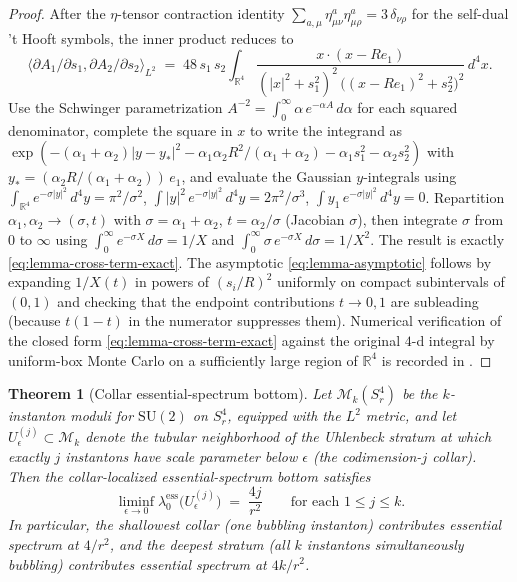 \documentclass[11pt,letterpaper]{article}
\newtheorem{theorem}{Theorem}[section]
\theoremstyle{definition}
\newcommand{\bbR}{\mathbb{R}}
\newcommand{\cM}{\mathcal{M}}
\begin{document}
\begin{proof}
After the $\eta$-tensor contraction identity $\sum_{a,\mu} \eta^a_{\mu\nu}\eta^a_{\mu\rho} = 3\,\delta_{\nu\rho}$ for the self-dual 't Hooft symbols, the inner product reduces to
\[
\langle \partial A_1/\partial s_1, \partial A_2/\partial s_2\rangle_{L^2}
\;=\; 48\,s_1\,s_2 \int_{\bbR^4} \frac{x\cdot(x - R e_1)}{(|x|^2 + s_1^2)^2\,\bigl((x - R e_1)^2 + s_2^2\bigr)^2}\,d^4x.
\]
Use the Schwinger parametrization $A^{-2} = \int_0^\infty \alpha\, e^{-\alpha A}\,d\alpha$ for each squared denominator, complete the square in $x$ to write the integrand as $\exp(-(\alpha_1+\alpha_2)|y - y_*|^2 - \alpha_1\alpha_2 R^2/(\alpha_1+\alpha_2) - \alpha_1 s_1^2 - \alpha_2 s_2^2)$ with $y_* = (\alpha_2 R/(\alpha_1+\alpha_2))\,e_1$, and evaluate the Gaussian $y$-integrals using $\int_{\bbR^4} e^{-\sigma|y|^2}\,d^4y = \pi^2/\sigma^2$, $\int |y|^2\,e^{-\sigma|y|^2}\,d^4y = 2\pi^2/\sigma^3$, $\int y_1\,e^{-\sigma|y|^2}\,d^4y = 0$. Repartition $\alpha_1, \alpha_2 \to (\sigma, t)$ with $\sigma = \alpha_1+\alpha_2$, $t = \alpha_2/\sigma$ (Jacobian $\sigma$), then integrate $\sigma$ from $0$ to $\infty$ using $\int_0^\infty e^{-\sigma X}\,d\sigma = 1/X$ and $\int_0^\infty \sigma\,e^{-\sigma X}\,d\sigma = 1/X^2$. The result is exactly \eqref{eq:lemma-cross-term-exact}. The asymptotic \eqref{eq:lemma-asymptotic} follows by expanding $1/X(t)$ in powers of $(s_i/R)^2$ uniformly on compact subintervals of $(0,1)$ and checking that the endpoint contributions $t \to 0, 1$ are subleading (because $t(1-t)$ in the numerator suppresses them). Numerical verification of the closed form \eqref{eq:lemma-cross-term-exact} against the original $4$-d integral by uniform-box Monte Carlo on a sufficiently large region of $\bbR^4$ is recorded in \cite{bonfioli-core}.
\end{proof}

\begin{theorem}[Collar essential-spectrum bottom]\label{thm:M_k-collar-conditional}
Let $\cM_k(S^4_r)$ be the $k$-instanton moduli for $\mathrm{SU}(2)$ on $S^4_r$, equipped with the $L^2$ metric, and let $U_\epsilon^{(j)} \subset \cM_k$ denote the tubular neighborhood of the Uhlenbeck stratum at which exactly $j$ instantons have scale parameter below $\epsilon$ (the codimension-$j$ collar). Then the collar-localized essential-spectrum bottom satisfies
\[
\liminf_{\epsilon \to 0} \lambda_0^{\mathrm{ess}}\bigl(U_\epsilon^{(j)}\bigr) \;=\; \frac{4 j}{r^2}\qquad\text{for each }1 \le j \le k.
\]
In particular, the shallowest collar (one bubbling instanton) contributes essential spectrum at $4/r^2$, and the deepest stratum (all $k$ instantons simultaneously bubbling) contributes essential spectrum at $4k/r^2$.
\end{theorem}
\end{document}
